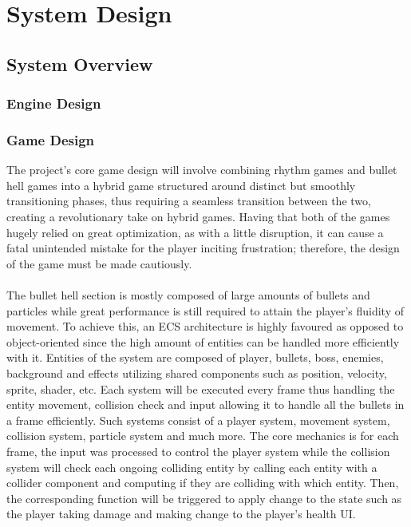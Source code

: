 \section{System Design}
\label{sec:system-design}

\subsection{System Overview}
\label{subsec:system-overview}

\subsubsection*{Engine Design}


\subsubsection*{Game Design}

The project’s core game design will involve combining rhythm games and bullet hell games into a hybrid game
structured around distinct but smoothly transitioning phases,
thus requiring a seamless transition between the two, creating a revolutionary take on hybrid games.
Having that both of the games hugely relied on great optimization, as with a little disruption,
it can cause a fatal unintended mistake for the player inciting frustration;
therefore, the design of the game must be made cautiously.
\\\\

The bullet hell section is mostly composed of large amounts of bullets and particles
while great performance is still required to attain the player’s fluidity of movement.
To achieve this, an ECS architecture is highly favoured as opposed to object-oriented
since the high amount of entities can be handled more efficiently with it.
Entities of the system are composed of player, bullets, boss, enemies, background and effects
utilizing shared components such as position, velocity, sprite, shader, etc.
Each system will be executed every frame thus handling the entity movement,
collision check and input allowing it to handle all the bullets in a frame efficiently.
Such systems consist of a player system, movement system, collision system, particle system and much more.
The core mechanics is for each frame, the input was processed to control the player system
while the collision system will check each ongoing colliding entity by calling each entity with a collider component
and computing if they are colliding with which entity.
Then, the corresponding function will be triggered to apply change to the state such as the player taking damage and making change to the player’s health UI\@.

